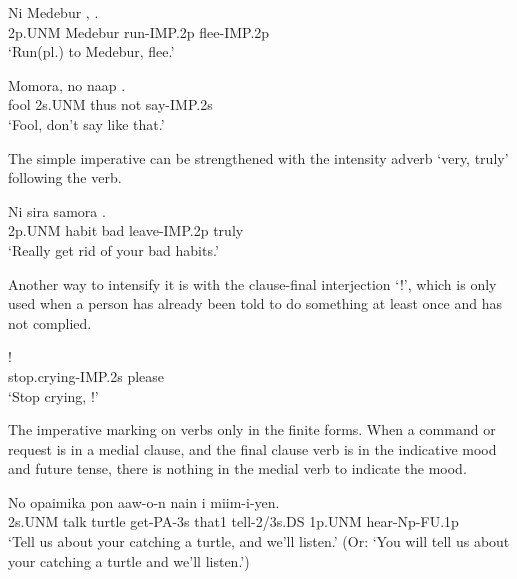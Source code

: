 \ea%
\label{ex:x1072}
\gll Ni  Medebur  ,  . \\
2p.UNM  Medebur  run-IMP.2p  flee-IMP.2p      \\
\glt `Run(pl.) to Medebur, flee.'
\z





\ea%
\label{ex:x1075}
\gll Momora,  no  naap  . \\
fool  2s.UNM  thus  not  say-IMP.2s      \\
\glt `Fool, don't say like that.'
\z





The simple imperative can be strengthened with the intensity adverb  `very, truly' following the verb.

\ea%
\label{ex:x1073}
\gll Ni  sira  samora  .\\ 
2p.UNM  habit  bad  leave-IMP.2p  truly\\
\glt `Really get rid of your bad habits.'
\z





Another way to intensify it is with the clause-final interjection  `!', which is only used when a person has already been told to do something at least once and has not complied.

\ea%
\label{ex:x1074}
\gll {}! \\
 stop.crying-IMP.2s  please     \\
\glt `Stop crying, !'
\z





The imperative marking on verbs  only in the finite forms. When a command or request is in a medial clause, and the final clause verb is in the indicative mood and future tense, there is nothing in the medial verb to indicate the mood. 

\ea%
\label{ex:x1076}
\gll No  opaimika  pon  aaw-o-n  nain   i  miim-i-yen.\\
2s.UNM  talk  turtle  get-PA-3s  that1  tell-2/3s.DS 1p.UNM  hear-Np-FU.1p     \\
\glt `Tell us about your catching a turtle, and we'll listen.' (Or: `You will tell us about your catching a turtle and we'll listen.')
\z


